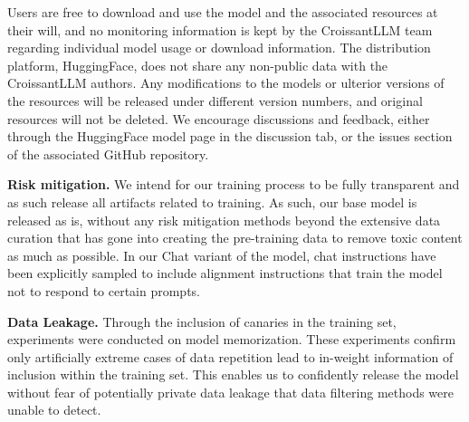 Users are free to download and use the model and the associated resources at their will, and no monitoring information is kept by the CroissantLLM team regarding individual model usage or download information. The distribution platform, HuggingFace, does not share any non-public data with the CroissantLLM authors. Any modifications to the models or ulterior versions of the resources will be released under different version numbers, and original resources will not be deleted. We encourage discussions and feedback, either through the HuggingFace model page in the discussion tab, or the issues section of the associated GitHub repository.


\textbf{Risk mitigation.} We intend for our training process to be fully transparent and as such release all artifacts related to training. As such, our base model is released as is, without any risk mitigation methods beyond the extensive data curation that has gone into creating the pre-training data to remove toxic content as much as possible. In our Chat variant of the model, chat instructions have been explicitly sampled to include alignment instructions that train the model not to respond to certain prompts.

 \textbf{Data Leakage.} Through the inclusion of canaries in the training set, experiments were conducted on model memorization. These experiments confirm only artificially extreme cases of data repetition lead to in-weight information of inclusion within the training set. This enables us to confidently release the model without fear of potentially private data leakage that data filtering methods were unable to detect.

